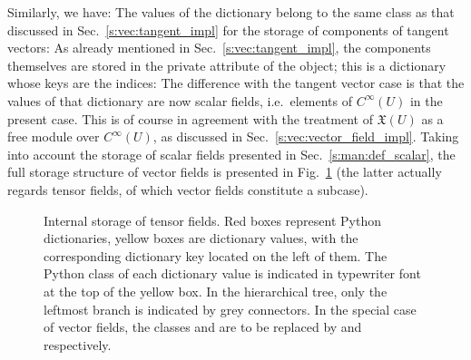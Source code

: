 Similarly, we have:
The values of the dictionary  belong to the same class
 as that discussed in Sec.~\ref{s:vec:tangent_impl} for
the storage of components of tangent vectors:
As already mentioned in Sec.~\ref{s:vec:tangent_impl}, the components themselves are stored
in the private attribute  of the  object; this is a dictionary
whose keys are the indices:
The difference with the tangent vector case is that the values of that dictionary are now scalar fields, i.e.\ elements of $C^\infty(U)$ in the present case. This is of course in agreement with the treatment of $\mathfrak{X}(U)$ as a free module over $C^\infty(U)$,
as discussed in Sec.~\ref{s:vec:vector_field_impl}.
Taking into account the storage of scalar fields presented in Sec.~\ref{s:man:def_scalar},
the full storage structure of vector fields is presented in Fig.~\ref{f:vec:storage_tensor}
(the latter actually regards tensor fields, of which vector fields constitute a subcase).

\begin{figure}
\begin{center}

\end{center}
\caption{\label{f:vec:storage_tensor} \footnotesize
Internal storage of tensor fields. Red boxes
represent Python dictionaries, yellow boxes are dictionary values, with the corresponding
dictionary key located on the left of them.
The Python class of each dictionary value is indicated in typewriter font at the top of the
yellow box. In the hierarchical tree, only the leftmost
branch is indicated by grey connectors. In the special case of vector fields, the classes
 and  are to be replaced by  and  respectively.}
\end{figure}

